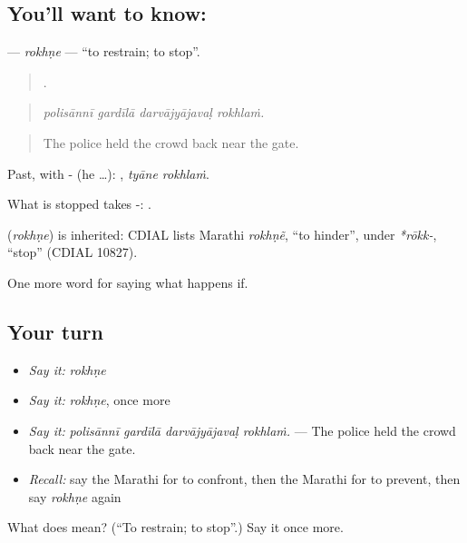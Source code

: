 \subsection*{You'll want to know: }
\textbf{} — \emph{rokhṇe} — \textquotedblleft{}to restrain; to stop\textquotedblright{}.

\begin{quote}
   .
\end{quote}

\begin{quote}
\emph{polisānnī gardīlā darvājyājavaḷ rokhlaṁ.}
\end{quote}

\begin{quote}
The police held the crowd back near the gate.
\end{quote}

Past, with - (he …):  , \emph{tyāne rokhlaṁ}.

What is stopped takes -:  .

\begin{cousinweb}
\textbf{} (\emph{rokhṇe}) is inherited: CDIAL lists Marathi \emph{rokhṇẽ}, \textquotedblleft{}to hinder\textquotedblright{}, under \emph{*rōkk-}, \textquotedblleft{}stop\textquotedblright{} (CDIAL 10827).
\end{cousinweb}

\begin{grammarlens}[title={What you've built}]
One more word for saying what happens if.
\end{grammarlens}

\subsection*{Your turn}
\begin{itemize}
\raggedright
  \item \emph{Say it:} \emph{rokhṇe}
  \item \emph{Say it:} \emph{rokhṇe}, once more
  \item \emph{Say it:} \emph{polisānnī gardīlā darvājyājavaḷ rokhlaṁ.} — The police held the crowd back near the gate.
  \item \emph{Recall:} say the Marathi for to confront, then the Marathi for to prevent, then say \emph{rokhṇe} again
\end{itemize}

\begin{tcolorbox}[breakable,colback=teal!4,colframe=teal!35!black,title={Before you move on}]
What does  mean? (\textquotedblleft{}To restrain; to stop\textquotedblright{}.) Say it once more.
\end{tcolorbox}
